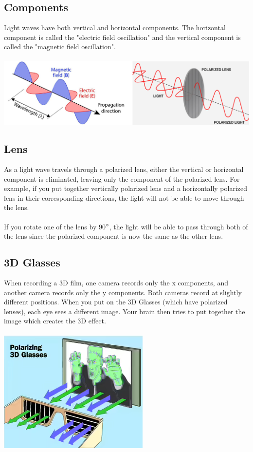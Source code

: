 \documentclass{article}
\begin{document}
\subsection{Components}
Light waves have both vertical and horizontal components. The horizontal component is called the "electric field oscillation" and the vertical component is called the "magnetic field oscillation".\\\\
\includegraphics[scale=0.45]{images/polarization} \\

\subsection{Lens}
\noindent As a light wave travels through a polarized lens, either the vertical or horizontal component is eliminated, leaving only the component of the polarized lens.
For example, if you put together vertically polarized lens and a horizontally polarized lens in their corresponding directions, the light will not be able to move through the lens.
\\\\If you rotate one of the lens by 90$\degree$, the light will be able to pass through both of the lens since the polarized component is now the same as the other lens.

\subsection{3D Glasses}
When recording a 3D film, one camera records only the x components, and another camera records only the y components. Both cameras record at slightly different positions.
When you put on the 3D Glasses (which have polarized lenses), each eye sees a different image. Your brain then tries to put together the image which creates the 3D effect.\\\\
\includegraphics[scale=0.35]{images/3d_glasses} \\
\end{document}
